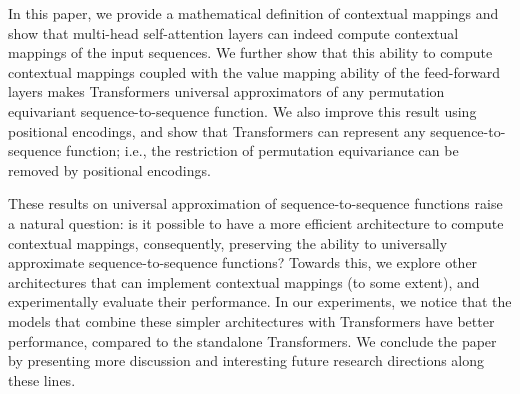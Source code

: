 \documentclass{article} %
\begin{document}
In this paper, we provide a mathematical definition of contextual mappings and show that multi-head self-attention layers can indeed compute contextual mappings of the input sequences. We further show that this ability to compute contextual mappings coupled with the value mapping ability of the feed-forward layers makes Transformers universal approximators of any permutation equivariant sequence-to-sequence function. We also improve this result using positional encodings, and show that Transformers can represent any sequence-to-sequence function; i.e., the restriction of permutation equivariance can be removed by positional encodings.


These results on universal approximation of sequence-to-sequence functions raise a natural question:
is it possible to have a more efficient architecture to compute contextual mappings, consequently, preserving the ability to universally approximate sequence-to-sequence functions? Towards this, we explore other architectures that can implement contextual mappings (to some extent), and experimentally evaluate their performance. In our experiments, we notice that the models that combine these simpler architectures with Transformers have better performance, compared to the standalone Transformers.
We conclude the paper by presenting more discussion and interesting future research directions along these lines.

\end{document}
